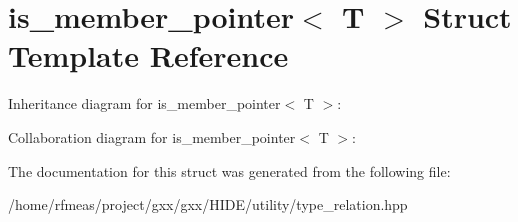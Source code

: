 \hypertarget{structis__member__pointer}{}\section{is\+\_\+member\+\_\+pointer$<$ T $>$ Struct Template Reference}
\label{structis__member__pointer}


Inheritance diagram for is\+\_\+member\+\_\+pointer$<$ T $>$\+:


Collaboration diagram for is\+\_\+member\+\_\+pointer$<$ T $>$\+:


The documentation for this struct was generated from the following file\+:\begin{DoxyCompactItemize}
\item 
/home/rfmeas/project/gxx/gxx/\+H\+I\+D\+E/utility/type\+\_\+relation.\+hpp\end{DoxyCompactItemize}
